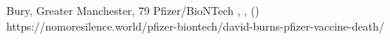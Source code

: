           {
            Bury, Greater Manchester, 
          }
          {
            79
          }
          {
            Pfizer/BioNTech
          }
          {
          }
          {
            ,
            ,
             ()
          }
          {
            https://nomoresilence.world/pfizer-biontech/david-burns-pfizer-vaccine-death/
          }

